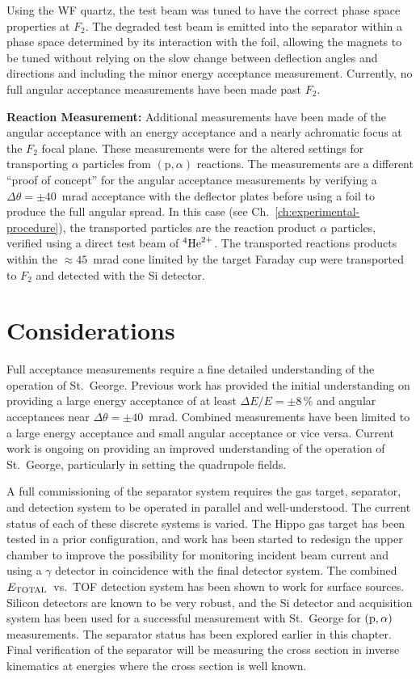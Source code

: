 Using the WF quartz, the test beam was tuned to have the correct phase
space properties at $F_2$. The degraded test beam is emitted into the
separator within a phase space determined by its interaction with the
foil, allowing the magnets to be tuned without relying on the slow
change between deflection angles and directions and including the minor
energy acceptance measurement. Currently, no full angular acceptance
measurements have been made past $F_2$.


\textbf{Reaction Measurement:}
Additional measurements have been made of the angular acceptance with an
energy acceptance and a nearly achromatic focus at the $F_2$ focal
plane. These measurements were for the altered settings for transporting
$\alpha$ particles from $(\textrm{p},\alpha)$ reactions. The
measurements are a different ``proof of concept'' for the angular
acceptance measurements by verifying a $\Delta\theta = \pm 40$~mrad
acceptance with the deflector plates before using a foil to produce the
full angular spread. In this case (see
Ch.~\ref{ch:experimental-procedure}), the transported particles are the
reaction product $\alpha$ particles, verified using a direct test beam
of ${}^{4}\textrm{He}^{2+}$. The transported reactions products within the
$\approx 45$~mrad cone limited by the target Faraday cup were
transported to $F_2$ and detected with the Si detector.


\section{Considerations}

Full acceptance measurements require a fine detailed understanding of
the operation of St.\ George. Previous work has provided the initial
understanding on providing a large energy acceptance of at least $\Delta
E/E = \pm 8$\,\% and angular acceptances near $\Delta\theta = \pm
40$~mrad. Combined measurements have been limited to a large energy
acceptance and small angular acceptance or vice versa. Current work is
ongoing on providing an improved understanding of the operation of St.\
George, particularly in setting the quadrupole fields.

A full commissioning of the separator system requires the gas target,
separator, and detection system to be operated in parallel and
well-understood. The current status of each of these discrete systems is
varied. The Hippo gas target has been tested in a prior configuration,
and work has been started to redesign the upper chamber to improve the
possibility for monitoring incident beam current and using a $\gamma$
detector in coincidence with the final detector system. The combined
$E_{\rm{TOTAL}}$~vs.~TOF detection system has been shown to work for
surface sources. Silicon detectors are known to be very robust, and the
Si detector and acquisition system has been used for a successful
measurement with St.\ George for $(\rm{p},\alpha)$ measurements. The
separator status has been explored earlier in this chapter. Final
verification of the separator will be measuring the
 cross section in
inverse kinematics at energies where the cross section is well known.


